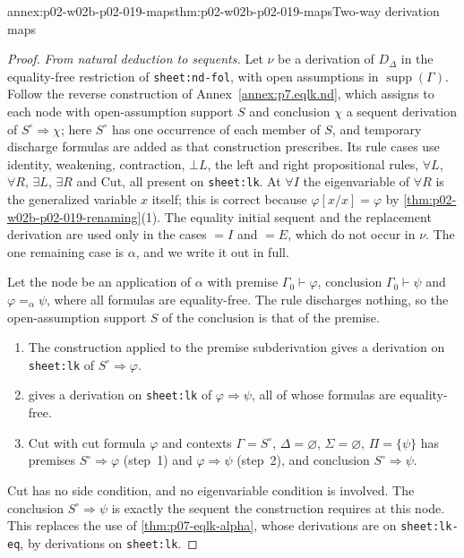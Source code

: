 \begin{annexitem}{annex:p02-w02b-p02-019-maps}{thm:p02-w02b-p02-019-maps}{Two-way derivation maps}
\begin{proof}
\emph{From natural deduction to sequents.}  Let \(\nu\) be a derivation of
\(D_{\Delta}\) in the equality-free restriction of \texttt{sheet:nd-fol},
with open assumptions in \(\operatorname{supp}(\Gamma)\).  Follow the
reverse construction of Annex~\ref{annex:p7.eqlk.nd}, which assigns to each
node with open-assumption support \(S\) and conclusion \(\chi\) a sequent
derivation of \(S^{\circ}\Rightarrow\chi\); here \(S^{\circ}\) has one
occurrence of each member of \(S\), and temporary discharge formulas are
added as that construction prescribes.  Its rule cases use identity,
weakening, contraction, \(\bot L\), the left and right propositional rules,
\(\forall L\), \(\forall R\), \(\exists L\), \(\exists R\) and Cut, all
present on \texttt{sheet:lk}.  At \(\forall I\) the eigenvariable of
\(\forall R\) is the generalized variable \(x\) itself; this is correct
because \(\varphi[x/x]=\varphi\) by
\cref{thm:p02-w02b-p02-019-renaming}(1).  The equality initial sequent and
the replacement derivation are used only in the cases \(=I\) and \(=E\),
which do not occur in \(\nu\).  The one remaining case is \(\alpha\), and we
write it out in full.

Let the node be an application of \(\alpha\) with premise
\(\Gamma_0\vdash\varphi\), conclusion \(\Gamma_0\vdash\psi\) and
\(\varphi=_{\alpha}\psi\), where all formulas are equality-free.  The rule
discharges nothing, so the open-assumption support \(S\) of the conclusion is
that of the premise.
\begin{enumerate}
 \item The construction applied to the premise subderivation gives a
   derivation on \texttt{sheet:lk} of \(S^{\circ}\Rightarrow\varphi\).
 \item {} gives a derivation on
   \texttt{sheet:lk} of \(\varphi\Rightarrow\psi\), all of whose formulas are
   equality-free.
 \item Cut with cut formula \(\varphi\) and contexts \(\Gamma=S^{\circ}\),
   \(\Delta=\varnothing\), \(\Sigma=\varnothing\), \(\Pi=\{\psi\}\) has
   premises \(S^{\circ}\Rightarrow\varphi\) (step~1) and
   \(\varphi\Rightarrow\psi\) (step~2), and conclusion
   \(S^{\circ}\Rightarrow\psi\).
\end{enumerate}
Cut has no side condition, and no eigenvariable condition is involved.  The
conclusion \(S^{\circ}\Rightarrow\psi\) is exactly the sequent the
construction requires at this node.  This replaces the use of
\cref{thm:p07-eqlk-alpha}, whose derivations are on \texttt{sheet:lk-eq}, by
derivations on \texttt{sheet:lk}.


\end{proof}
\end{annexitem}
